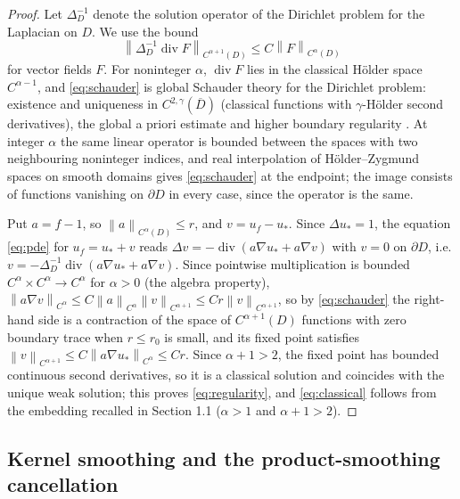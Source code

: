 \documentclass[11pt]{article}
\numberwithin{equation}{section}
\newcommand{\norm}[1]{\left\|#1\right\|}
\newcommand{\diver}{\operatorname{div}}
\begin{document}
\begin{proof}
Let $\Delta_D^{-1}$ denote the solution operator of the Dirichlet
problem for the Laplacian on $D$. We use the bound
\begin{equation}\label{eq:schauder}
 \norm{\Delta_D^{-1}\diver F}_{C^{\alpha+1}(D)}\le C\norm F_{C^\alpha(D)}
\end{equation}
for vector fields $F$. For noninteger $\alpha$, $\diver F$ lies in the
classical H\"older space $C^{\alpha-1}$, and \eqref{eq:schauder} is
global Schauder theory for the Dirichlet problem: existence and
uniqueness in $C^{2,\gamma}(\overline D)$ (classical functions with
$\gamma$-H\"older second derivatives), the global a priori estimate
and higher boundary regularity \cite[Theorems 6.14, 6.6 and 6.19]{GT}.
At integer $\alpha$ the same linear operator is bounded between the
spaces with two neighbouring noninteger indices, and real interpolation
of H\"older--Zygmund spaces on smooth domains
\cite[Sections 1.6, 4.5 and 5.1--5.2]{Triebel} gives
\eqref{eq:schauder} at the endpoint; the image consists of functions
vanishing on $\partial D$ in every case, since the operator is the same.

Put $a=f-1$, so $\norm a_{C^\alpha(D)}\le r$, and $v=u_f-u_*$. Since
$\Delta u_*=1$, the equation \eqref{eq:pde} for $u_f=u_*+v$ reads
$\Delta v=-\diver(a\nabla u_*+a\nabla v)$ with $v=0$ on $\partial D$,
i.e. $v=-\Delta_D^{-1}\diver(a\nabla u_*+a\nabla v)$. Since pointwise
multiplication is bounded $C^\alpha\times C^\alpha\to C^\alpha$ for
$\alpha>0$ (the algebra property),
$\norm{a\nabla v}_{C^\alpha}\le C\norm a_{C^\alpha}\norm{v}_{C^{\alpha+1}}
\le Cr\norm v_{C^{\alpha+1}}$, so by \eqref{eq:schauder} the right-hand
side is a contraction of the space of $C^{\alpha+1}(D)$ functions with
zero boundary trace when $r\le r_0$ is small, and its fixed point
satisfies $\norm v_{C^{\alpha+1}}\le C\norm{a\nabla u_*}_{C^\alpha}\le
Cr$. Since $\alpha+1>2$, the fixed point has bounded continuous second
derivatives, so it is a classical solution and coincides with the
unique weak solution; this proves
\eqref{eq:regularity}, and \eqref{eq:classical} follows from the
embedding recalled in Section 1.1 ($\alpha>1$ and $\alpha+1>2$).
\end{proof}

\subsection{Kernel smoothing and the product-smoothing cancellation}\label{sec:smoothing}
\end{document}
